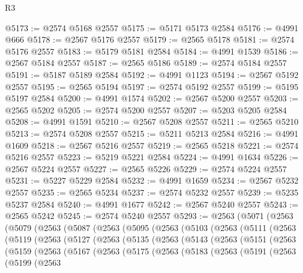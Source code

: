 \begin{lexlean}{R3}
\begin{coremodule}
@5173 := @2574 @5168 @2557
@5175 := @5171 @5173 @2584
@5176 := @4991 @666
@5178 := @2567 @5176 @2557
@5179 := @2565 @5178
@5181 := @2574 @5176 @2557
@5183 := @5179 @5181 @2584
@5184 := @4991 @1539
@5186 := @2567 @5184 @2557
@5187 := @2565 @5186
@5189 := @2574 @5184 @2557
@5191 := @5187 @5189 @2584
@5192 := @4991 @1123
@5194 := @2567 @5192 @2557
@5195 := @2565 @5194
@5197 := @2574 @5192 @2557
@5199 := @5195 @5197 @2584
@5200 := @4991 @1574
@5202 := @2567 @5200 @2557
@5203 := @2565 @5202
@5205 := @2574 @5200 @2557
@5207 := @5203 @5205 @2584
@5208 := @4991 @1591
@5210 := @2567 @5208 @2557
@5211 := @2565 @5210
@5213 := @2574 @5208 @2557
@5215 := @5211 @5213 @2584
@5216 := @4991 @1609
@5218 := @2567 @5216 @2557
@5219 := @2565 @5218
@5221 := @2574 @5216 @2557
@5223 := @5219 @5221 @2584
@5224 := @4991 @1634
@5226 := @2567 @5224 @2557
@5227 := @2565 @5226
@5229 := @2574 @5224 @2557
@5231 := @5227 @5229 @2584
@5232 := @4991 @1659
@5234 := @2567 @5232 @2557
@5235 := @2565 @5234
@5237 := @2574 @5232 @2557
@5239 := @5235 @5237 @2584
@5240 := @4991 @1677
@5242 := @2567 @5240 @2557
@5243 := @2565 @5242
@5245 := @2574 @5240 @2557
@5293 := @2563
    (@5071
      (@2563
        (@5079
          (@2563
            (@5087
              (@2563
                (@5095
                  (@2563
                    (@5103
                      (@2563
                        (@5111
                          (@2563
                            (@5119
                              (@2563
                                (@5127
                                  (@2563
                                    (@5135
                                      (@2563
                                        (@5143
                                          (@2563
                                            (@5151
                                              (@2563
                                                (@5159
                                                  (@2563
                                                    (@5167
                                                      (@2563
                                                        (@5175
                                                          (@2563
                                                            (@5183
                                                              (@2563
                                                                (@5191
                                                                  (@2563
                                                                    (@5199
                                                                      (@2563

\end{coremodule}
\end{lexlean}
